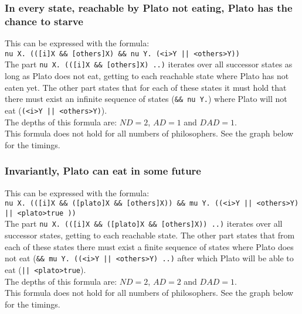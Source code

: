 \documentclass[10pt,a4paper]{article}
\begin{document}
\subsubsection{In every state, reachable by Plato not eating, Plato has the chance to starve}
This can be expressed with the formula:\\
{\tt nu X. (([i]X \&\& [others]X) \&\& nu Y. (<i>Y || <others>Y))}\\
The part {\tt nu X. (([i]X \&\& [others]X) ..)} iterates over all successor states as long as Plato does not eat, getting to each reachable state where Plato has not eaten yet. The other part states that for each of these states it must hold that there must exist an infinite sequence of states ({\tt \&\& nu Y.}) where Plato will not eat ({\tt (<i>Y || <others>Y)}).\\
The depths of this formula are: $ND = 2$, $AD = 1$ and $DAD = 1$.\\
This formula does not hold for all numbers of philosophers. See the graph below for the timings.\\


\subsubsection{Invariantly, Plato can eat in some future}
This can be expressed with the formula:\\
{\tt nu X. (([i]X \&\& ([plato]X \&\& [others]X)) \&\& mu Y. ((<i>Y || <others>Y) || <plato>true ))}\\
The part {\tt nu X. (([i]X \&\& ([plato]X \&\& [others]X)) ..)} iterates over all successor states, getting to each reachable state. The other part states that from each of these states there must exist a finite sequence of states where Plato does not eat ({\tt \&\& mu Y. ((<i>Y || <others>Y) ..)} after which Plato will be able to eat ({\tt || <plato>true}).\\
The depths of this formula are: $ND = 2$, $AD = 2$ and $DAD = 1$.\\
This formula does not hold for all numbers of philosophers. See the graph below for the timings.\\
\end{document}
